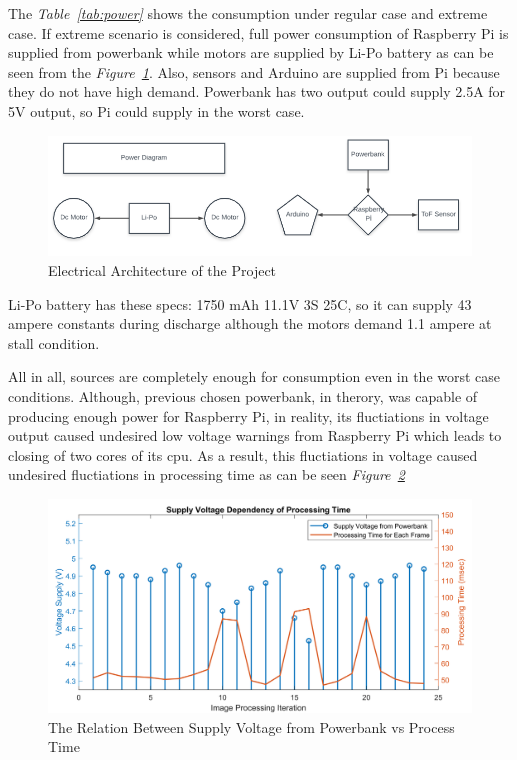 \documentclass[a4paper,12pt]{article}
\begin{document}
		The \textit{Table~\ref{tab:power}} shows the consumption under regular case and extreme case. If extreme scenario is considered, full power consumption of Raspberry Pi is supplied from powerbank while motors are supplied by Li-Po battery as can be seen from the \textit{Figure~\ref{fig:elec}}. Also, sensors and Arduino are supplied from Pi because they do not have high demand. Powerbank has two output could supply 2.5A for 5V output, so Pi could supply in the worst case.
		
		\begin{figure}[H]
			\includegraphics[width=\textwidth,center]{images/elec_arch2}
			\caption{Electrical Architecture of the Project}\label{fig:elec}
		\end{figure}
		
		Li-Po battery has these specs: 1750 mAh 11.1V 3S 25C, so it can supply 43 ampere constants during discharge although the motors demand 1.1 ampere at stall condition. 

		 All in all, sources are completely enough for consumption even in the worst case conditions. Although, previous chosen powerbank, in therory, was capable of producing enough power for Raspberry Pi, in reality, its fluctiations in voltage output caused undesired low voltage warnings from Raspberry Pi which leads to closing of two cores of its cpu. As a result, this fluctiations in voltage caused undesired fluctiations in processing time as can be seen \textit{Figure~\ref{fig:processTime}}  

	\begin{figure}[h]
		\includegraphics[width=\textwidth,center]{images/ROT_ROI/voltageSupply_crop}
		\caption{The Relation Between Supply Voltage from Powerbank vs Process Time}\label{fig:processTime}
	\end{figure}
\end{document}
